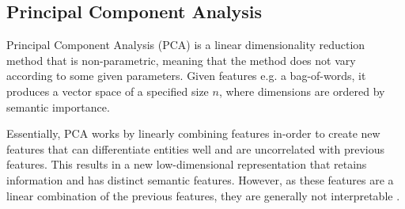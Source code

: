 
%




\subsection{Principal Component Analysis}\label{ch2:PCA}









Principal Component Analysis (PCA) is a linear dimensionality reduction method that is non-parametric, meaning that the method does not vary according to some given parameters. Given features e.g.  a bag-of-words, it produces a vector space of a specified size $n$, where dimensions are  ordered by semantic importance. 

Essentially, PCA works by linearly combining features in-order to create new features that can differentiate entities well and are uncorrelated with previous features. This results in a new low-dimensional representation that retains information and has distinct semantic features. However, as these features are a linear combination of the previous features, they are generally not interpretable \cite{Gimenez}. 


